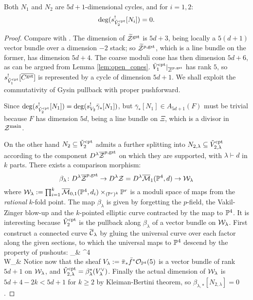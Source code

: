 \begin{lem}\label{lem:boundary}
 Both $N_1$ and $N_2$ are $5d+1$-dimensional cycles, and for $i=1,2$: \[\deg(s_{\tilde{V}_2^{\rm{cpt}}}^![N_i])=0.\]
\end{lem}
\begin{proof}
 Compare with \cite[Lemma 8.1]{CLpfields}. The dimension of $\widetilde{\mathcal Z}^{\rm{gst}}$ is $5d+3$, being locally a $5(d+1)$ vector bundle over a dimension $-2$ stack; so $\widetilde{\mathcal Z}^{p,\rm{gst}}$, which is a line bundle on the former, has dimension $5d+4$. The coarse moduli cone has then dimension $5d+6$, as can be argued from Lemma \ref{lem:open_cones}. $\tilde{V}_1^{\rm{cpt}}\rvert_{\overline{\mathcal Z}^{p,\rm{gst}}}$ has rank $5$, so $s_{\tilde{V}_1^{\rm{cpt}}}^![\overline {C^{\rm{gst}}}]$ is represented by a cycle of dimension $5d+1$. We shall exploit the commutativity of Gysin pullback with proper pushforward.

Since $\deg(s_{\tilde{V}_2^{\rm{cpt}}}^![N_1])=\deg(s_{V_2}^!\bar{\gamma}_*[N_1])$, but $\bar{\gamma}_*[N_1]\in A_{5d+1}(F)$ must be trivial because $F$ has dimension $5d$, being a line bundle on $\Xi$, which is a divisor in $\mathcal Z^{\rm{main}}$.

On the other hand $N_2\subseteq \tilde{V}_2^{\rm{cpt}}$ admits a further splitting into $N_{2,\lambda}\subseteq \tilde{V}_{2,\lambda}^{\rm{cpt}}$ according to the component $D^{\lambda}\overline{\mathcal Z}^{p,\rm{gst}}$ on which they are supported, with $\lambda\vdash d$ in $k$ parts. There exists a comparison morphism:
\[\beta_{\lambda}\colon D^\lambda\overline{\mathcal Z}^{p,\rm{gst}}\rightarrow D^\lambda\mathcal Z=D^\lambda\overline{\mathcal{M}}_1(\mathbb P^4,d)\rightarrow \mathcal W_{\lambda}\]
where $\mathcal W_{\lambda}:=\prod_{i=1}^k \overline{\mathcal{M}}_{0,1}(\mathbb P^4,d_i)\times_{(\mathbb P^r)^k}\mathbb P^r$ is a moduli space of maps from the \emph{rational} $k$-fold point. The map $\beta_{\lambda}$ is given by forgetting the $p$-field,  the Vakil-Zinger blow-up and the $k$-pointed elliptic curve contracted by the map to $\mathbb P^4$. It is interesting because $\tilde{V}_2^{\rm{cpt}}$ is the pullback along $\beta_{\lambda}$ of a vector bundle on $\mathcal W_{\lambda}$. First construct a connected curve $\overline {\mathcal{C}}_\lambda$ by gluing the universal curve over each factor along the given sections, to which the universal maps to $\mathbb P^4$ descend by the property of pushouts:
\bcd
\overline \cC_\lambda \ar[d,"\bar\pi"]\ar[r,"\bar f"] & \PP^4 \\
\pazocal W_\lambda &
\ecd
Notice now that the sheaf $V_\lambda:=\bar\pi_*\bar f^*\mathcal{O}_{\mathbb P^4}(5)$ is a vector bundle of rank $5d+1$ on $\mathcal W_\lambda$, and $\tilde{V}_{2,\lambda}^{\rm{cpt}}=\beta_{\lambda}^*(V_\lambda^\vee)$. Finally the actual dimension of $\mathcal W_\lambda$ is $5d+4-2k <5d+1$ for $k\geq 2$ by Kleiman-Bertini theorem, so $\beta_{\lambda,*}[N_{2,\lambda}]=0$.

\end{proof}
